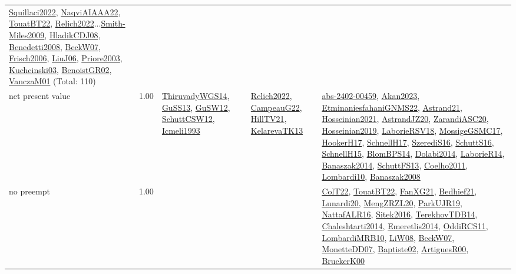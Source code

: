{\begin{longtable}{p{3cm}r>{\raggedright\arraybackslash}p{6cm}>{\raggedright\arraybackslash}p{6cm}>{\raggedright\arraybackslash}p{8cm}}
\hyperref[detail:Squillaci2022]{Squillaci2022}, \hyperref[detail:NaqviAIAAA22]{NaqviAIAAA22}, \hyperref[detail:TouatBT22]{TouatBT22}, \hyperref[detail:Relich2022]{Relich2022}...\hyperref[detail:Smith-Miles2009]{Smith-Miles2009}, \hyperref[detail:HladikCDJ08]{HladikCDJ08}, \hyperref[detail:Benedetti2008]{Benedetti2008}, \hyperref[detail:BeckW07]{BeckW07}, \hyperref[detail:Frisch2006]{Frisch2006}, \hyperref[detail:LiuJ06]{LiuJ06}, \hyperref[detail:Priore2003]{Priore2003}, \hyperref[detail:Kuchcinski03]{Kuchcinski03}, \hyperref[detail:BenoistGR02]{BenoistGR02}, \hyperref[detail:VanczaM01]{VanczaM01} (Total: 110)\\
\index{net present value}\index{Concepts!net present value}net present value &  1.00 & \hyperref[detail:ThiruvadyWGS14]{ThiruvadyWGS14}, \hyperref[detail:GuSS13]{GuSS13}, \hyperref[detail:GuSW12]{GuSW12}, \hyperref[detail:SchuttCSW12]{SchuttCSW12}, \hyperref[detail:Icmeli1993]{Icmeli1993} & \hyperref[detail:Relich2022]{Relich2022}, \hyperref[detail:CampeauG22]{CampeauG22}, \hyperref[detail:HillTV21]{HillTV21}, \hyperref[detail:KelarevaTK13]{KelarevaTK13} & \hyperref[detail:abs-2402-00459]{abs-2402-00459}, \hyperref[detail:Akan2023]{Akan2023}, \hyperref[detail:EtminaniesfahaniGNMS22]{EtminaniesfahaniGNMS22}, \hyperref[detail:Astrand21]{Astrand21}, \hyperref[detail:Hosseinian2021]{Hosseinian2021}, \hyperref[detail:AstrandJZ20]{AstrandJZ20}, \hyperref[detail:ZarandiASC20]{ZarandiASC20}, \hyperref[detail:Hosseinian2019]{Hosseinian2019}, \hyperref[detail:LaborieRSV18]{LaborieRSV18}, \hyperref[detail:MossigeGSMC17]{MossigeGSMC17}, \hyperref[detail:HookerH17]{HookerH17}, \hyperref[detail:SchnellH17]{SchnellH17}, \hyperref[detail:SzerediS16]{SzerediS16}, \hyperref[detail:SchuttS16]{SchuttS16}, \hyperref[detail:SchnellH15]{SchnellH15}, \hyperref[detail:BlomBPS14]{BlomBPS14}, \hyperref[detail:Dolabi2014]{Dolabi2014}, \hyperref[detail:LaborieR14]{LaborieR14}, \hyperref[detail:Banaszak2014]{Banaszak2014}, \hyperref[detail:SchuttFS13]{SchuttFS13}, \hyperref[detail:Coelho2011]{Coelho2011}, \hyperref[detail:Lombardi10]{Lombardi10}, \hyperref[detail:Banaszak2008]{Banaszak2008}\\
\index{no preempt}\index{Concepts!no preempt}no preempt &  1.00 &  &  & \hyperref[detail:ColT22]{ColT22}, \hyperref[detail:TouatBT22]{TouatBT22}, \hyperref[detail:FanXG21]{FanXG21}, \hyperref[detail:Bedhief21]{Bedhief21}, \hyperref[detail:Lunardi20]{Lunardi20}, \hyperref[detail:MengZRZL20]{MengZRZL20}, \hyperref[detail:ParkUJR19]{ParkUJR19}, \hyperref[detail:NattafALR16]{NattafALR16}, \hyperref[detail:Sitek2016]{Sitek2016}, \hyperref[detail:TerekhovTDB14]{TerekhovTDB14}, \hyperref[detail:Chaleshtarti2014]{Chaleshtarti2014}, \hyperref[detail:Emeretlis2014]{Emeretlis2014}, \hyperref[detail:OddiRCS11]{OddiRCS11}, \hyperref[detail:LombardiMRB10]{LombardiMRB10}, \hyperref[detail:LiW08]{LiW08}, \hyperref[detail:BeckW07]{BeckW07}, \hyperref[detail:MonetteDD07]{MonetteDD07}, \hyperref[detail:Baptiste02]{Baptiste02}, \hyperref[detail:ArtiguesR00]{ArtiguesR00}, \hyperref[detail:BruckerK00]{BruckerK00}\\

\end{longtable}}
